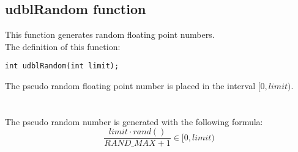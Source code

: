 \subsection{\textbf{udblRandom} function} \label{sec:udblRandom}

This function generates random floating point numbers.\\

The definition of this function:
%
\begin{verbatim}
int udblRandom(int limit);  
\end{verbatim}
%
The pseudo random floating point number is placed in the interval $[0,limit)$.\\ \\
%
%
\ \\
%
The pseudo random number is generated with the following formula:
%
\begin{displaymath}
\frac{limit \cdot rand()}{RAND\_MAX + 1} \in [0,limit)
\end{displaymath}
%
